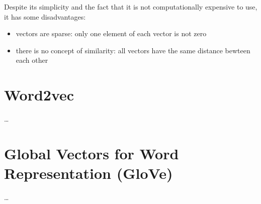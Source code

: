 Despite its simplicity and the fact that it is not computationally expensive to use, it has some disadvantages:
\begin{itemize}
    \item vectors are sparse: only one element of each vector is not zero
    \item there is no concept of similarity: all vectors have the same distance bewteen each other
\end{itemize}

\section{Word2vec}
\dots

\section{Global Vectors for Word Representation (GloVe)}
\dots